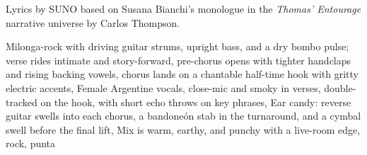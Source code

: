 
\begin{notes}
Lyrics by SUNO based on Susana Bianchi's monologue in the \emph{Thomas’ Entourage} narrative universe by Carlos Thompson.
\end{notes}
\begin{style}
Milonga-rock with driving guitar strums, upright bass, and a dry bombo pulse; verse rides intimate and story-forward, pre-chorus opens with tighter handclaps and rising backing vowels, chorus lands on a chantable half-time hook with gritty electric accents, Female Argentine vocals, close-mic and smoky in verses, double-tracked on the hook, with short echo throws on key phrases, Ear candy: reverse guitar swells into each chorus, a bandoneón stab in the turnaround, and a cymbal swell before the final lift, Mix is warm, earthy, and punchy with a live-room edge, rock, punta
\end{style}
